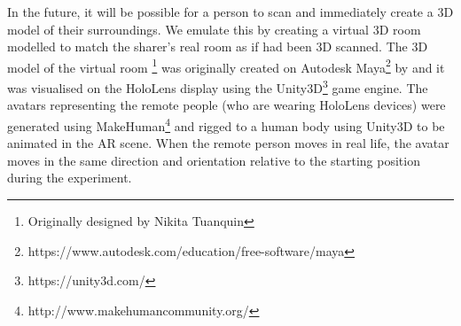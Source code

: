 
In the future, it will be possible for a person to scan and immediately create a 3D model of their surroundings. We emulate this by creating a virtual 3D room modelled to match the sharer's real room as if had been 3D scanned. The 3D model of the virtual room \footnote{Originally designed by Nikita Tuanquin} was originally created on Autodesk Maya\footnote{https://www.autodesk.com/education/free-software/maya} by  and it was visualised on the HoloLens display using the Unity3D\footnote{https://unity3d.com/} game engine. The avatars representing the remote people (who are wearing HoloLens devices) were generated using MakeHuman\footnote{http://www.makehumancommunity.org/} and rigged to a human body using Unity3D to be animated in the AR scene. When the remote person moves in real life, the avatar moves in the same direction and orientation relative to the starting position during the experiment. 


